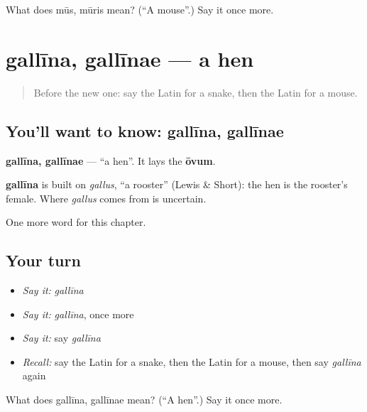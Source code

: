 \begin{tcolorbox}[breakable,colback=teal!4,colframe=teal!35!black,title={Before you move on}]
What does mūs, mūris mean? (\textquotedblleft{}A mouse\textquotedblright{}.) Say it once more.
\end{tcolorbox}
\section[gallīna, gallīnae]{gallīna, gallīnae — a hen}

\label{lesson:LA-C92-gallina}



\begin{quote}
Before the new one: say the Latin for a snake, then the Latin for a mouse.
\end{quote}

\subsection*{You'll want to know: gallīna, gallīnae}
\textbf{gallīna, gallīnae} — \textquotedblleft{}a hen\textquotedblright{}. It lays the \textbf{ōvum}.

\begin{cousinweb}
\textbf{gallīna} is built on \emph{gallus}, \textquotedblleft{}a rooster\textquotedblright{} (Lewis \& Short): the hen is the rooster's female. Where \emph{gallus} comes from is uncertain.
\end{cousinweb}

\begin{grammarlens}[title={What you've built}]
One more word for this chapter.
\end{grammarlens}

\subsection*{Your turn}
\begin{itemize}
\raggedright
  \item \emph{Say it:} \emph{gallīna}
  \item \emph{Say it:} \emph{gallīna}, once more
  \item \emph{Say it:} say \emph{gallīna}
  \item \emph{Recall:} say the Latin for a snake, then the Latin for a mouse, then say \emph{gallīna} again
\end{itemize}

\begin{tcolorbox}[breakable,colback=teal!4,colframe=teal!35!black,title={Before you move on}]
What does gallīna, gallīnae mean? (\textquotedblleft{}A hen\textquotedblright{}.) Say it once more.
\end{tcolorbox}
